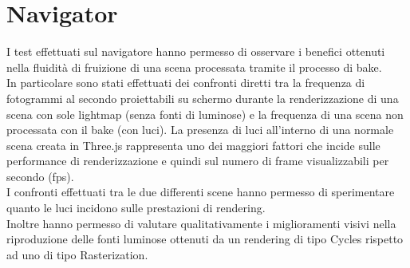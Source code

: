 \section{Navigator}
\label{sec:chapter_prove_sperimentali_navigator}
I test effettuati sul navigatore hanno permesso di osservare i benefici ottenuti nella fluidità di fruizione di una scena processata tramite il processo di  bake.
\\
In particolare sono stati effettuati dei confronti diretti tra la frequenza di fotogrammi al secondo proiettabili su schermo durante la renderizzazione di una scena con sole lightmap (senza fonti di luminose) e la frequenza di una scena non processata con il bake (con luci).
La presenza di luci all’interno di una normale scena creata in Three.js rappresenta uno dei maggiori fattori che incide sulle performance di renderizzazione e quindi sul numero di frame visualizzabili per secondo (fps).
\\
I confronti effettuati tra le due differenti scene hanno permesso di sperimentare quanto le luci incidono sulle prestazioni di rendering.
\\ 
Inoltre hanno permesso di valutare qualitativamente i miglioramenti visivi nella riproduzione delle fonti luminose ottenuti da un rendering di tipo Cycles rispetto ad uno di tipo Rasterization.


